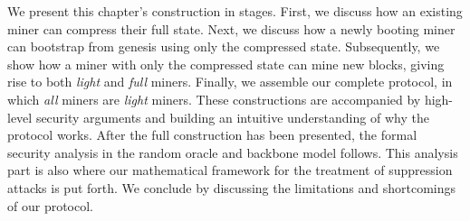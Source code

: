 We present this chapter's construction in stages. First, we discuss how an existing
miner can compress their full state. Next, we discuss how a newly booting
miner can bootstrap from genesis using only the compressed state.
Subsequently, we show how a miner with only the compressed state can
mine new blocks, giving rise to both \emph{light} and \emph{full} miners.
Finally, we assemble our complete protocol, in which \emph{all} miners are \emph{light}
miners. These constructions are accompanied by high-level security arguments
and building an intuitive understanding of why the protocol works.
After the full construction has been presented,
the formal security analysis in the random oracle and backbone model follows.
This analysis part is also where our mathematical
framework for the treatment of suppression attacks is put forth. We conclude
by discussing the limitations and shortcomings of our protocol.
